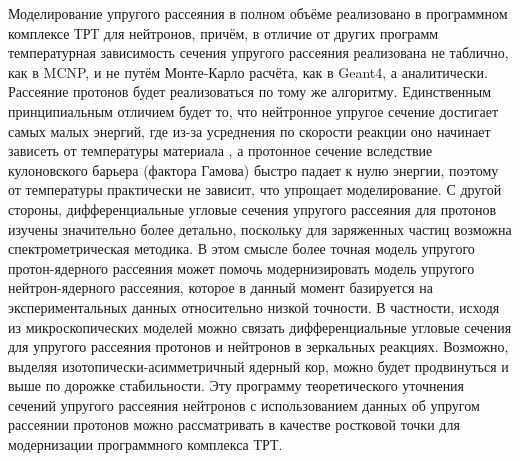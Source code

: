 \documentclass[a4paper,12pt]{article}
\begin{document}
\begin{large}
	Моделирование упругого рассеяния в полном объёме реализовано в программном комплексе ТРТ для нейтронов, причём, в отличие от других программ температурная зависимость сечения упругого рассеяния реализована не таблично, как в MCNP, и не путём Монте-Карло расчёта, как в Geant4, а аналитически.
	Рассеяние протонов будет реализоваться по тому же алгоритму.
	Единственным принципиальным отличием будет то, что нейтронное упругое сечение достигает самых малых энергий, где из-за усреднения по скорости реакции оно начинает зависеть от температуры материала \cite{70/190-T}, а протонное сечение вследствие кулоновского барьера (фактора Гамова) быстро падает к нулю энергии, поэтому от температуры практически не зависит, что упрощает моделирование.
	С другой стороны, дифференциальные угловые сечения упругого рассеяния для протонов изучены значительно более детально, поскольку для заряженных частиц возможна спектрометрическая методика.
	В этом смысле более точная модель упругого протон-ядерного рассеяния может помочь модернизировать модель упругого нейтрон-ядерного рассеяния, которое в данный момент базируется на экспериментальных данных относительно низкой точности.
	В частности, исходя из микроскопических моделей можно связать дифференциальные угловые сечения для упругого рассеяния протонов и нейтронов в зеркальных реакциях.
	Возможно, выделяя изотопически-асимметричный ядерный кор, можно будет продвинуться и выше по дорожке стабильности.
	Эту программу теоретического уточнения сечений упругого рассеяния нейтронов с использованием данных об упругом рассеянии протонов можно рассматривать в качестве ростковой точки для модернизации программного комплекса ТРТ.


\end{large}
\end{document}
